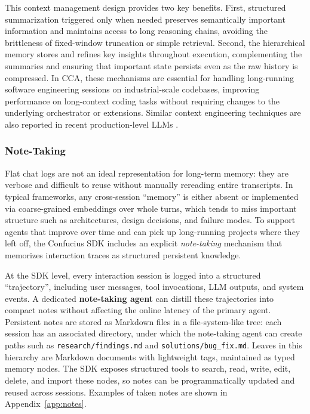This context management design provides two key benefits.
First, structured summarization triggered only when needed preserves semantically important information and maintains access to long reasoning chains, avoiding the brittleness of fixed-window truncation or simple retrieval.
Second, the hierarchical memory stores and refines key insights throughout execution, complementing the summaries and ensuring that important state persists even as the raw history is compressed.
In CCA, these mechanisms are essential for handling long-running software engineering sessions on industrial-scale codebases, improving performance on long-context coding tasks without requiring changes to the underlying orchestrator or extensions. 
Similar context engineering techniques are also reported in recent production-level LLMs \citep{anthropic2025contextengineering, openai2025sessionmemory}.


\subsubsection{Note-Taking}
\label{sec.note_taking}

Flat chat logs are not an ideal representation for long-term memory: they are verbose and difficult to reuse without manually rereading entire transcripts. In typical frameworks, any cross-session ``memory'' is either absent or implemented via coarse-grained embeddings over whole turns, which tends to miss important structure such as architectures, design decisions, and failure modes. To support agents that improve over time and can pick up long-running projects where they left off, the Confucius SDK includes an explicit \emph{note-taking} mechanism that memorizes interaction traces as structured persistent knowledge.

At the SDK level, every interaction session is logged into a structured ``trajectory'', including user messages, tool invocations, LLM outputs, and system events. A dedicated \textbf{note-taking agent} can distill these trajectories into compact notes without affecting the online latency of the primary agent. Persistent notes are stored as Markdown files in a file-system-like tree: each session has an associated directory, under which the note-taking agent can create paths such as \texttt{research/findings.md} and  \texttt{solutions/bug\_fix.md}. Leaves in this hierarchy are Markdown documents with lightweight tags, maintained as typed memory nodes. The SDK exposes structured tools to search, read, write, edit, delete, and import these nodes, so notes can be programmatically updated and reused across sessions. Examples of taken notes are shown in Appendix~\ref{app:notes}.

